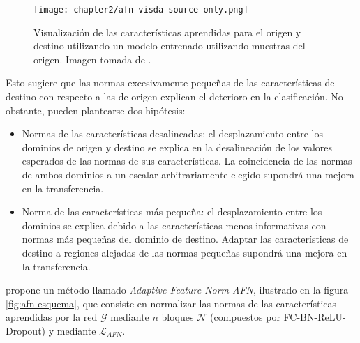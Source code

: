 \begin{figure}[H]
  \centering
  \texttt{[image: chapter2/afn-visda-source-only.png]}

  \caption[Representación de características aprendidas de una CNN]{Visualización de las características aprendidas para el origen y destino utilizando un modelo entrenado utilizando muestras del origen. Imagen tomada de \cite{xu2019larger}.}
  \label{fig:afn-source-only}
\end{figure}

Esto sugiere que las normas excesivamente pequeñas de las características de destino con respecto a las de origen
explican el deterioro en la clasificación. No obstante, pueden plantearse dos hipótesis:

\begin{itemize}
  \item Normas de las características desalineadas: el desplazamiento entre los dominios de origen y destino se explica en la
        desalineación de los valores esperados de las normas de sus características. La coincidencia de las normas de ambos
        dominios a un escalar arbitrariamente elegido supondrá una mejora en la transferencia.
  \item Norma de las características más pequeña: el desplazamiento entre los dominios se explica debido a las características
        menos informativas con normas más pequeñas del dominio de destino. Adaptar las características de destino a regiones
        alejadas de las normas pequeñas supondrá una mejora en la transferencia.
\end{itemize}

\cite{xu2019larger} propone un método llamado {\it Adaptive Feature Norm AFN}, ilustrado en la figura \ref{fig:afn-esquema}, que consiste en normalizar las normas de las características aprendidas por la red $\mathcal{G}$ mediante $n$ bloques $\mathcal{N}$ (compuestos por FC-BN-ReLU-Dropout) y mediante $\mathcal{L}_{AFN}$.

